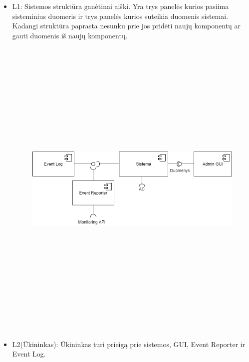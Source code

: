 \documentclass[oneside]{VUMIFPSkursinis}
\begin{document}
\begin{itemize}
\item L1: Sistemos struktūra ganėtinai aiški. Yra trys panelės kurios pasiima sisteminius duomeris ir trys panelės kurios suteikia duomenis sistemai. Kadangi struktūra paprasta nesunku prie jos pridėti naujų komponentų ar gauti duomenis iš naujų komponentų.
\begin{figure}[H]
		\centering	
	\includegraphics[width=15cm,height=15cm,keepaspectratio]{2L2Uk.png}
	\caption{}
	\label{fig:}
\end{figure}
\item L2(Ūkininkas): Ūkininkas turi prieigą prie sistemos, GUI, Event Reporter ir Event Log.
\begin{figure}[H]
		\centering	

\end{figure}
\end{itemize}
\end{document}

